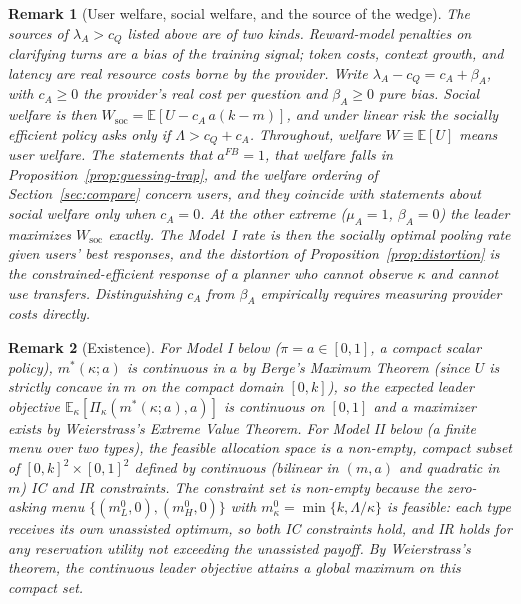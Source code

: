 \documentclass[11pt]{article}
\newtheorem{remark}{Remark}
\begin{document}
\begin{remark}[User welfare, social welfare, and the source of the wedge]
\label{rmk:welfare-notion}
The sources of $\lambda_A > c_Q$ listed above are of two kinds. Reward-model penalties on clarifying turns are a bias of the training signal; token costs, context growth, and latency are real resource costs borne by the provider. Write $\lambda_A - c_Q = c_A + \beta_A$, with $c_A \ge 0$ the provider's real cost per question and $\beta_A \ge 0$ pure bias. Social welfare is then $W_{\text{soc}} = \mathbb{E}[U - c_A\, a(k-m)]$, and under linear risk the socially efficient policy asks only if $\Lambda > c_Q + c_A$. Throughout, welfare $W \equiv \mathbb{E}[U]$ means \emph{user} welfare. The statements that $a^{FB} = 1$, that welfare falls in Proposition~\ref{prop:guessing-trap}, and the welfare ordering of Section~\ref{sec:compare} concern users, and they coincide with statements about social welfare only when $c_A = 0$. At the other extreme ($\mu_A = 1$, $\beta_A = 0$) the leader maximizes $W_{\text{soc}}$ exactly. The Model~I rate is then the socially optimal pooling rate given users' best responses, and the distortion of Proposition~\ref{prop:distortion} is the constrained-efficient response of a planner who cannot observe $\kappa$ and cannot use transfers. Distinguishing $c_A$ from $\beta_A$ empirically requires measuring provider costs directly.
\end{remark}

\begin{remark}[Existence]
For Model I below ($\pi=a\in[0,1]$, a compact scalar policy), $m^*(\kappa;a)$ is continuous in $a$ by Berge's Maximum Theorem (since $U$ is strictly concave in $m$ on the compact domain $[0, k]$), so the expected leader objective $\mathbb{E}_\kappa[\Pi_\kappa(m^*(\kappa;a), a)]$ is continuous on $[0,1]$ and a maximizer exists by Weierstrass's Extreme Value Theorem. For Model II below (a finite menu over two types), the feasible allocation space is a non-empty, compact subset of $[0,k]^2 \times [0,1]^2$ defined by continuous (bilinear in $(m,a)$ and quadratic in $m$) IC and IR constraints. The constraint set is non-empty because the zero-asking menu $\{(m^0_L, 0), (m^0_H, 0)\}$ with $m^0_\kappa = \min\{k, \Lambda/\kappa\}$ is feasible: each type receives its own unassisted optimum, so both IC constraints hold, and IR holds for any reservation utility not exceeding the unassisted payoff. By Weierstrass's theorem, the continuous leader objective attains a global maximum on this compact set.
\end{remark}
\end{document}
